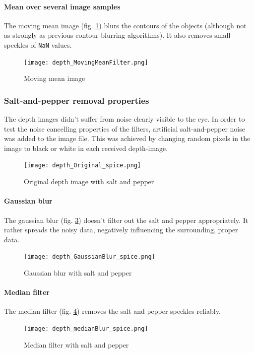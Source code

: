 \documentclass[DIV12,a4paper]{scrartcl}
\begin{document}
\paragraph{Mean over several image samples}
The moving mean image (fig. \ref{fig:moving_mean_depth}) blurs the contours of the objects (although not as strongly as previous contour blurring algorithms). It also removes small speckles of \texttt{NaN} values.
\begin{figure}[!htbp]
  \centering
  \texttt{[image: depth\_MovingMeanFilter.png]}
  \caption{Moving mean image}
  \label{fig:moving_mean_depth}
\end{figure}
\subsubsection{Salt-and-pepper removal properties}
\label{sec:grain_removal}
The depth images didn't suffer from noise clearly visible to the eye. In order to test the noise cancelling properties of the filters, artificial salt-and-pepper noise was added to the image file. This was achieved by changing random pixels in the image to black or white in each received depth-image. %
\par
\begin{figure}[!htbp]
  \centering
  \texttt{[image: depth\_Original\_spice.png]}
  \caption{Original depth image with salt and pepper}
  \label{fig:original_depth_spice}
\end{figure}
\paragraph{Gaussian blur}
The gaussian blur (fig. \ref{fig:gaussian_blur_spice}) doesn't filter out the salt and pepper appropriately. It rather spreads the noisy data, negatively influencing the surrounding, proper data.
\begin{figure}[!htbp]
  \centering
  \texttt{[image: depth\_GaussianBlur\_spice.png]}
  \caption{Gaussian blur with salt and pepper}
  \label{fig:gaussian_blur_spice}
\end{figure}
\paragraph{Median filter}
The median filter (fig. \ref{fig:median_depth_spice}) removes the salt and pepper speckles reliably.
\begin{figure}[!htbp]
  \centering
  \texttt{[image: depth\_medianBlur\_spice.png]}
  \caption{Median filter with salt and pepper}
  \label{fig:median_depth_spice}
\end{figure}
\end{document}
